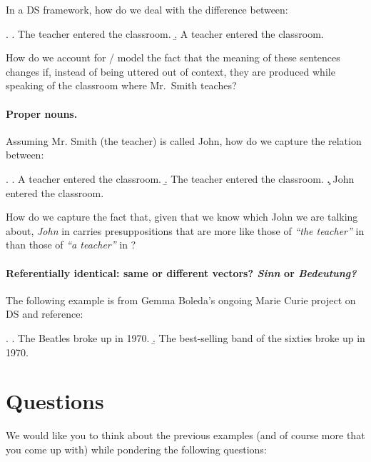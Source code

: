 \documentclass[a4paper,12pt]{article}
\begin{document}
In a DS framework, how do we deal with
the difference between:

\ex. \a. The teacher entered the classroom.
\b. A teacher entered the classroom.

How do 
we account for / model the fact that the meaning
of these sentences changes if, instead of
being uttered out of context, they are produced while speaking of the
classroom where Mr.~Smith teaches?

\paragraph{Proper nouns.}

Assuming Mr. Smith (the teacher) is called John, how do we capture the
relation between:

\ex. \a. A teacher entered the classroom.
\b. The teacher entered the classroom.
\c. John entered the classroom.

How do we capture the fact that, given that we know which John we are
talking about, \emph{John} in \Last[c] carries presuppositions that
are more like those of \emph{``the teacher''} in \Last[b] than those
of \emph{``a teacher''} in \Last[a]?

\paragraph{Referentially identical: same or different
  vectors? \emph{Sinn} or \emph{Bedeutung?}}

The following example is from Gemma Boleda's ongoing Marie Curie
project on DS and reference:

\ex. \a. The Beatles broke up in 1970.
\b. The best-selling band of the sixties broke up in 1970.





\section{Questions}
\label{sec:questions}

We would like you to think about the previous examples (and of course
more that you come up with) while pondering the following questions:
\end{document}
